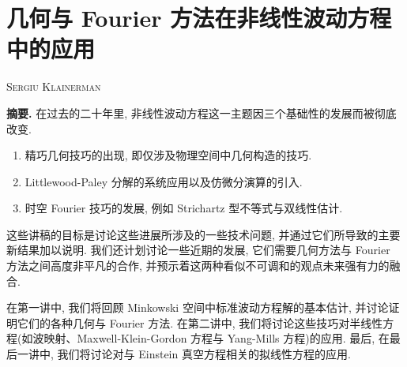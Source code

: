 
\setcounter{subsection}{0}
\setcounter{theorem}{0}
\setcounter{equation}{0}

\section*{几何与 Fourier 方法在非线性波动方程中的应用}

\noindent\textsc{Sergiu Klainerman}

\noindent\textbf{摘要.} 在过去的二十年里, 非线性波动方程这一主题因三个基础性的发展而被彻底改变. 

\begin{enumerate}
\def\labelenumi{\arabic{enumi}.}
\item 精巧几何技巧的出现, 即仅涉及物理空间中几何构造的技巧. 
\item Littlewood-Paley 分解的系统应用以及仿微分演算的引入. 
\item 时空 Fourier 技巧的发展, 例如 Strichartz 型不等式与双线性估计. 
\end{enumerate}

这些讲稿的目标是讨论这些进展所涉及的一些技术问题, 并通过它们所导致的主要新结果加以说明. 我们还计划讨论一些近期的发展, 它们需要几何方法与 Fourier 方法之间高度非平凡的合作, 并预示着这两种看似不可调和的观点未来强有力的融合. 

在第一讲中, 我们将回顾 Minkowski 空间中标准波动方程解的基本估计, 并讨论证明它们的各种几何与 Fourier 方法. 在第二讲中, 我们将讨论这些技巧对半线性方程(如波映射、Maxwell-Klein-Gordon 方程与 Yang-Mills 方程)的应用. 最后, 在最后一讲中, 我们将讨论对与 Einstein 真空方程相关的拟线性方程的应用. 

